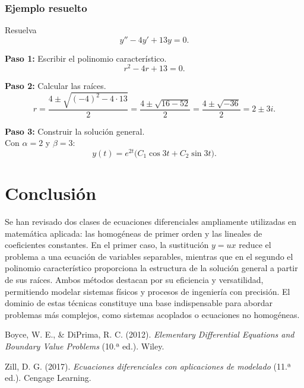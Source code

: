 \documentclass[stu,12pt,donotrepeattitle]{apa7}
\begin{document}
\subsubsection*{Ejemplo resuelto}
Resuelva
\[
y''-4y'+13y=0.
\]

\textbf{Paso 1:} Escribir el polinomio característico.
\[
r^2-4r+13=0.
\]

\textbf{Paso 2:} Calcular las raíces.
\[
r=\frac{4\pm\sqrt{(-4)^2-4\cdot 13}}{2}
=\frac{4\pm\sqrt{16-52}}{2}
=\frac{4\pm\sqrt{-36}}{2}
=2\pm 3i.
\]

\textbf{Paso 3:} Construir la solución general.\\
Con \(\alpha=2\) y \(\beta=3\):
\[
y(t)=e^{2t}\bigl(C_1\cos 3t+C_2\sin 3t\bigr).
\]

\section{Conclusión}
Se han revisado dos clases de ecuaciones diferenciales ampliamente utilizadas en matemática aplicada: las homogéneas de primer orden y las lineales de coeficientes constantes. En el primer caso, la sustitución \(y=ux\) reduce el problema a una ecuación de variables separables, mientras que en el segundo el polinomio característico proporciona la estructura de la solución general a partir de sus raíces. Ambos métodos destacan por su eficiencia y versatilidad, permitiendo modelar sistemas físicos y procesos de ingeniería con precisión. El dominio de estas técnicas constituye una base indispensable para abordar problemas más complejos, como sistemas acoplados o ecuaciones no homogéneas.

\begin{thebibliography}{}

Boyce, W. E., \& DiPrima, R. C. (2012). \emph{Elementary Differential Equations and Boundary Value Problems} (10.ª ed.). Wiley.

Zill, D. G. (2017). \emph{Ecuaciones diferenciales con aplicaciones de modelado} (11.ª ed.). Cengage Learning.

\end{thebibliography}
\end{document}
